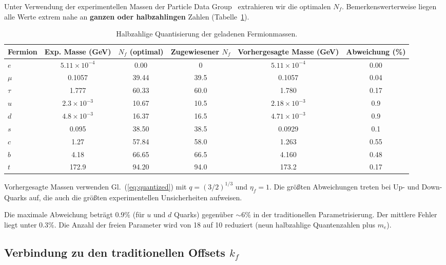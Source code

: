 \documentclass[12pt,a4paper]{article}
\begin{document}
	Unter Verwendung der experimentellen Massen der Particle Data Group~\cite{PDG2024} extrahieren wir die optimalen $N_f$. Bemerkenswerterweise liegen alle Werte extrem nahe an \textbf{ganzen oder halbzahlingen} Zahlen (Tabelle~\ref{tab:masses}).
	
	\begin{table}[htbp]
		\centering
		\caption{Halbzahlige Quantisierung der geladenen Fermionmassen.}
		\label{tab:masses}
		\begin{tabular}{l c c c c c}
			\toprule
			Fermion & Exp. Masse (GeV) & $N_f$ (optimal) & Zugewiesener $N_f$ & Vorhergesagte Masse (GeV) & Abweichung (\%) \\
			\midrule
			$e$   & $5.11\times10^{-4}$ & 0.00  & 0      & $5.11\times10^{-4}$ & 0.00 \\
			$\mu$  & 0.1057                & 39.44 & 39.5   & 0.1057               & 0.04 \\
			$\tau$ & 1.777                 & 60.33 & 60.0   & 1.780                & 0.17 \\
			$u$   & $2.3\times10^{-3}$    & 10.67 & 10.5   & $2.18\times10^{-3}$  & 0.9 \\
			$d$   & $4.8\times10^{-3}$    & 16.37 & 16.5   & $4.71\times10^{-3}$  & 0.9 \\
			$s$   & 0.095                 & 38.50 & 38.5   & 0.0929               & 0.1 \\
			$c$   & 1.27                  & 57.84 & 58.0   & 1.263                & 0.55 \\
			$b$   & 4.18                  & 66.65 & 66.5   & 4.160                & 0.48 \\
			$t$   & 172.9                 & 94.20 & 94.0   & 173.2                & 0.17 \\
			\bottomrule
		\end{tabular}
		\par\smallskip
		\footnotesize Vorhergesagte Massen verwenden Gl.~(\ref{eq:quantized}) mit $q = (3/2)^{1/3}$ und $\eta_f = 1$. Die größten Abweichungen treten bei Up- und Down-Quarks auf, die auch die größten experimentellen Unsicherheiten aufweisen.
	\end{table}
	
	Die maximale Abweichung beträgt $0.9\%$ (für $u$ und $d$ Quarks) gegenüber $\sim 6\%$ in der traditionellen Parametrisierung. Der mittlere Fehler liegt unter $0.3\%$. Die Anzahl der freien Parameter wird von 18 auf 10 reduziert (neun halbzahlige Quantenzahlen plus $m_e$).
	
	\subsection{Verbindung zu den traditionellen Offsets $k_f$}
	
\end{document}

